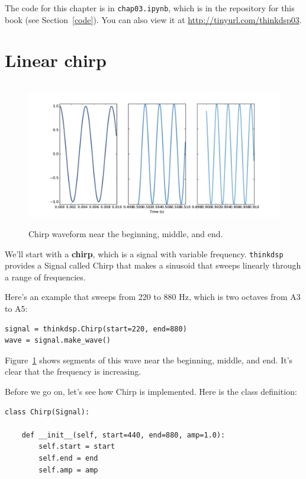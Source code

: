 \documentclass[12pt]{book}
\begin{document}
The code for this chapter is in {\tt chap03.ipynb}, which is in the
repository for this book (see Section~\ref{code}).
You can also view it at \url{http://tinyurl.com/thinkdsp03}.


\section{Linear chirp}

\begin{figure}
\centerline{\includegraphics[height=2.5in]{figs/chirp3.pdf}}
\caption{Chirp waveform near the beginning, middle, and end.}
\label{fig.chirp3}
\end{figure}

We'll start with a {\bf chirp}, which is a signal with variable
frequency.  {\tt thinkdsp} provides a Signal called Chirp that
makes a sinusoid that sweeps linearly through a range of
frequencies.

Here's an example that sweeps from 220 to 880 Hz, which
is two octaves from A3 to A5:

\begin{verbatim}
signal = thinkdsp.Chirp(start=220, end=880)
wave = signal.make_wave()
\end{verbatim}

Figure~\ref{fig.chirp3} shows segments of this wave near the
beginning, middle, and end.  It's clear that the frequency is
increasing.

Before we go on, let's see how Chirp is implemented.  Here
is the class definition:

\begin{verbatim}
class Chirp(Signal):
    
    def __init__(self, start=440, end=880, amp=1.0):
        self.start = start
        self.end = end
        self.amp = amp
\end{verbatim}
\end{document}
